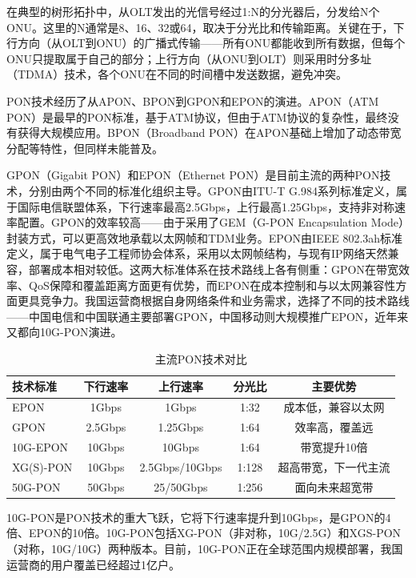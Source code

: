 在典型的树形拓扑中，从OLT发出的光信号经过1:N的分光器后，分发给N个ONU。这里的N通常是8、16、32或64，取决于分光比和传输距离。关键在于，下行方向（从OLT到ONU）的广播式传输——所有ONU都能收到所有数据，但每个ONU只提取属于自己的部分；上行方向（从ONU到OLT）则采用时分多址（TDMA）技术，各个ONU在不同的时间槽中发送数据，避免冲突。

 PON技术经历了从APON、BPON到GPON和EPON的演进。APON（ATM PON）是最早的PON标准，基于ATM协议，但由于ATM协议的复杂性，最终没有获得大规模应用。BPON（Broadband PON）在APON基础上增加了动态带宽分配等特性，但同样未能普及。

GPON（Gigabit PON）和EPON（Ethernet PON）是目前主流的两种PON技术，分别由两个不同的标准化组织主导。GPON由ITU-T G.984系列标准定义，属于国际电信联盟体系，下行速率最高2.5Gbps，上行最高1.25Gbps，支持非对称速率配置。GPON的效率较高——由于采用了GEM（G-PON Encapsulation Mode）封装方式，可以更高效地承载以太网帧和TDM业务。EPON由IEEE 802.3ah标准定义，属于电气电子工程师协会体系，采用以太网帧结构，与现有IP网络天然兼容，部署成本相对较低。这两大标准体系在技术路线上各有侧重：GPON在带宽效率、QoS保障和覆盖距离方面更有优势，而EPON在成本控制和与以太网兼容性方面更具竞争力。我国运营商根据自身网络条件和业务需求，选择了不同的技术路线——中国电信和中国联通主要部署GPON，中国移动则大规模推广EPON，近年来又都向10G-PON演进。

\begin{table}[htbp]
\centering
\caption{主流PON技术对比}
\begin{tabular}{|l|c|c|c|c|}
\hline
\textbf{技术标准} & \textbf{下行速率} & \textbf{上行速率} & \textbf{分光比} & \textbf{主要优势} \\
\hline
EPON & 1Gbps & 1Gbps & 1:32 & 成本低，兼容以太网 \\
\hline
GPON & 2.5Gbps & 1.25Gbps & 1:64 & 效率高，覆盖远 \\
\hline
10G-EPON & 10Gbps & 10Gbps & 1:64 & 带宽提升10倍 \\
\hline
XG(S)-PON & 10Gbps & 2.5Gbps/10Gbps & 1:128 & 超高带宽，下一代主流 \\
\hline
50G-PON & 50Gbps & 25/50Gbps & 1:256 & 面向未来超宽带 \\
\hline
\end{tabular}
\end{table}

10G-PON是PON技术的重大飞跃，它将下行速率提升到10Gbps，是GPON的4倍、EPON的10倍。10G-PON包括XG-PON（非对称，10G/2.5G）和XGS-PON（对称，10G/10G）两种版本。目前，10G-PON正在全球范围内规模部署，我国运营商的用户覆盖已经超过1亿户。

